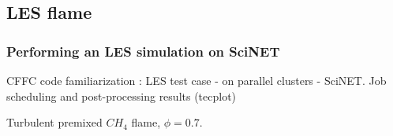 \documentclass{beamer}
\begin{document}
\subsection{LES flame}
\begin{frame}
\frametitle{Performing an LES simulation on SciNET}
\scriptsize
CFFC code familiarization : LES test case - on parallel clusters - SciNET. Job scheduling and post-processing results (tecplot)
\begin{minipage}[t][1\textheight]{1\textwidth}
\vspace{-10pt}
\begin{exampleblock}{Turbulent premixed $CH_4$ flame, $\phi=0.7$. }
\vspace{-20pt}
\begin{figure}
\label{fig:LES}
\centering
{}

\end{figure}
\end{exampleblock}
\end{minipage}
\end{frame}
\end{document}
